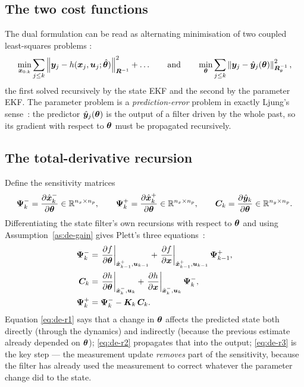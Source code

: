 \subsection{The two cost functions}
The dual formulation can be read as alternating minimisation of two coupled least-squares problems
\cite{wannelson2001dual}:
\begin{equation}
\min_{\bm{x}_{0:k}} \sum_{j\le k}\left\lVert \bm{y}_j-h(\bm{x}_j,\bm{u}_j;\hat{\bm{\theta}}) \right\rVert^2_{\bm{R}^{-1}}+\dots
\qquad\text{and}\qquad
\min_{\bm{\theta}} \sum_{j\le k}\left\lVert \bm{y}_j-\hat{\bm{y}}_j(\bm{\theta}) \right\rVert^2_{\bm{R}_\theta^{-1}},
\label{eq:de-costs}
\end{equation}
the first solved recursively by the state EKF and the second by the parameter EKF.  The parameter
problem is a \emph{prediction-error} problem in exactly Ljung's sense~\cite{ljung1979ekf}: the
predictor $\hat{\bm{y}}_j(\bm{\theta})$ is the output of a filter driven by the whole past, so its
gradient with respect to $\bm{\theta}$ must be propagated recursively.

\subsection{The total-derivative recursion}
Define the sensitivity matrices
\begin{equation}
\bm{\Psi}^-_k=\frac{\partial\hat{\bm{x}}^{-}_k}{\partial\bm{\theta}}\in\mathbb{R}^{n_x\times n_p},\qquad
\bm{\Psi}^+_k=\frac{\partial\hat{\bm{x}}^{+}_k}{\partial\bm{\theta}}\in\mathbb{R}^{n_x\times n_p},\qquad
\bm{C}_k=\frac{\partial\hat{\bm{y}}_k}{\partial\bm{\theta}}\in\mathbb{R}^{n_y\times n_p}.
\label{eq:de-psi}
\end{equation}
Differentiating the state filter's own recursions with respect to $\bm{\theta}$ and using
Assumption~\ref{as:de-gain} gives Plett's three equations~\cite[Part 3, §4]{plett2004ekf3}:
\begin{align}
\bm{\Psi}^-_k &= \left.\frac{\partial f}{\partial\bm{\theta}}\right|_{\hat{\bm{x}}^{+}_{k-1},\bm{u}_{k-1}}
                 +\left.\frac{\partial f}{\partial\bm{x}}\right|_{\hat{\bm{x}}^{+}_{k-1},\bm{u}_{k-1}}\bm{\Psi}^+_{k-1},
\label{eq:de-r1}\\
\bm{C}_k &= \left.\frac{\partial h}{\partial\bm{\theta}}\right|_{\hat{\bm{x}}^{-}_k,\bm{u}_k}
        +\left.\frac{\partial h}{\partial\bm{x}}\right|_{\hat{\bm{x}}^{-}_k,\bm{u}_k}\bm{\Psi}^-_k,
\label{eq:de-r2}\\
\bm{\Psi}^+_k &= \bm{\Psi}^-_k-\bm{K}_k\,\bm{C}_k .
\label{eq:de-r3}
\end{align}
Equation \eqref{eq:de-r1} says that a change in $\bm{\theta}$ affects the predicted state both directly
(through the dynamics) and indirectly (because the previous estimate already depended on
$\bm{\theta}$); \eqref{eq:de-r2} propagates that into the output; \eqref{eq:de-r3} is the key step ---
the measurement update \emph{removes} part of the sensitivity, because the filter has already used
the measurement to correct whatever the parameter change did to the state.

